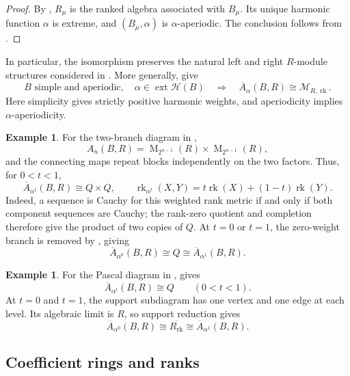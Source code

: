 \documentclass[11pt]{amsart}
\DeclareMathOperator{\rk}{rk}
\DeclareMathOperator{\Mat}{M}
\theoremstyle{definition}
\newtheorem{example}[theorem]{Example}
\theoremstyle{remark}
\begin{document}
\begin{proof}
By , $R_\mu$ is the ranked algebra
associated with $B_\mu$.  Its unique harmonic function $\alpha$ is
extreme, and $(B_\mu,\alpha)$ is $\alpha$-aperiodic.
The conclusion follows from .
\end{proof}

In particular, the isomorphism preserves the natural left and right
$R$-module structures considered in \cite{Halperin1968}.
More generally,  give
\[
 B\text{ simple and aperiodic},\quad
 \alpha\in\operatorname{ext}\mathcal H(B)
 \quad\Longrightarrow\quad
 \overline A_\alpha(B,R)\cong\mathcal M_{R,\rk}.
\]
Here simplicity gives strictly positive harmonic weights, and
aperiodicity implies $\alpha$-aperiodicity.

\begin{example}\label{ex:two-branch-rank-completions}
For the two-branch diagram in ,
\[
 A_n(B,R)=\Mat_{2^{n-1}}(R)\times\Mat_{2^{n-1}}(R),
\]
and the connecting maps repeat blocks independently on the two factors.
Thus, for $0<t<1$,
\begin{equation}\label{eq:two-branch-completion}
 \overline A_{\alpha^t}(B,R)\cong Q\times Q,\qquad
 \rk_{\alpha^t}(X,Y)=t\rk(X)+(1-t)\rk(Y).
\end{equation}
Indeed, a sequence is Cauchy for this weighted rank metric if and only
if both component sequences are Cauchy; the rank-zero quotient and
completion therefore give the product of two copies of $Q$.
At $t=0$ or $t=1$, the zero-weight branch is removed by
, giving
\[
 \overline A_{\alpha^0}(B,R)\cong Q
 \cong\overline A_{\alpha^1}(B,R).
\]

\end{example}

\begin{example}\label{ex:pascal-rank-completions}
For the Pascal diagram in ,  gives
\[
 \overline A_{\alpha^t}(B,R)\cong Q\qquad(0<t<1).
\]
At $t=0$ and $t=1$, the support subdiagram has one vertex and one edge
at each level.  Its algebraic limit is $R$, so support reduction gives
\[
 \overline A_{\alpha^0}(B,R)
 \cong\overline{R_{\rk}}\cong\overline A_{\alpha^1}(B,R).
\]
\end{example}

\subsection{Coefficient rings and ranks}
\label{subsec:coefficient-ranks}
\end{document}
